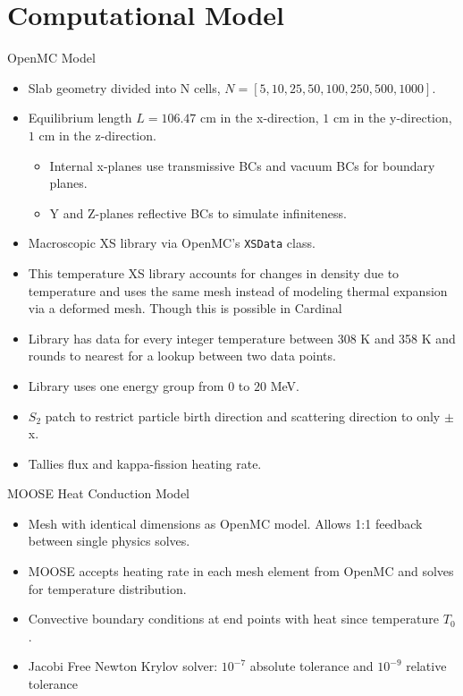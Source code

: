 \documentclass[9pt,t]{beamer}
\begin{document}
\section{Computational Model}
\begin{frame}{OpenMC Model}
    \pause
    \begin{itemize}
        \item<2->Slab geometry divided into N cells, $N=[5, 10, 25, 50, 100, 250, 500, 1000]$.
        \item<3-> Equilibrium length $L=106.47$ cm in the x-direction, $1$ cm in the y-direction, $1$ cm in the z-direction.
        \begin{itemize}
            \item<4-> Internal x-planes use transmissive BCs and vacuum BCs for boundary planes.
            \item<5-> Y and Z-planes reflective BCs to simulate infiniteness.
        \end{itemize}
        \item<6-> Macroscopic XS library via OpenMC's \texttt{XSData} class.
        \item<7-> This temperature XS library accounts for changes in density due to temperature and uses the same mesh instead of modeling thermal expansion via a deformed mesh. Though this is possible in Cardinal \cite{novak-2023}
        \item<8-> Library has data for every integer temperature between 308 K and 358 K and rounds to nearest for a lookup between two data points.
        \item<9-> Library uses one energy group from $0$ to $20$ MeV.
        \item<10-> $S_{2}$ patch to restrict particle birth direction and scattering direction to only $\pm$x.
        \item<11->Tallies flux and kappa-fission heating rate.
    \end{itemize}
\end{frame}

\begin{frame}{MOOSE Heat Conduction Model}
    \pause
    \begin{itemize}
        \item<2-> Mesh with identical dimensions as OpenMC model. Allows 1:1 feedback between single physics solves.
        \item<3-> MOOSE accepts heating rate in each mesh element from OpenMC and solves for temperature distribution.
        \item<4-> Convective boundary conditions at end points with heat since temperature $T_{0}$.
        \item<5-> Jacobi Free Newton Krylov solver: $10^{-7}$ absolute tolerance and $10^{-9}$ relative tolerance
    \end{itemize}
\end{frame}
\end{document}
